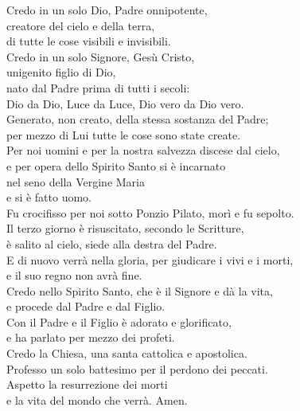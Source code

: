 
Credo in un solo Dio, Padre onnipotente,\\
creatore del cielo e della terra, \\
di tutte le cose visibili e invisibili.\\
Credo in un solo Signore, Gesù Cristo,\\
unigenito figlio di Dio,\\
nato dal Padre prima di tutti i secoli:\\
Dio da Dio, Luce da Luce, Dio vero da Dio vero.\\
Generato, non creato, della stessa sostanza del Padre;\\
per mezzo di Lui tutte le cose sono state create.\\
Per noi uomini e per la nostra salvezza discese dal cielo,\\ 
e per opera dello Spirito Santo si è incarnato\\
nel seno della Vergine Maria\\
e si è fatto uomo.\\	
Fu crocifisso per noi sotto Ponzio Pilato, morì e fu sepolto.\\
Il terzo giorno è risuscitato, secondo le Scritture,\\
è salito al cielo, siede alla destra del Padre.\\
E di nuovo verrà nella gloria, per giudicare i vivi e i morti,\\ 
e il suo regno non avrà fine.\\
Credo nello Spirito Santo, che è il Signore e dà la vita,\\
e procede dal Padre e dal Figlio.\\
Con il Padre e il Figlio è adorato e glorificato,\\
e ha parlato per mezzo dei profeti.\\
Credo la Chiesa, una santa cattolica e apostolica.\\
Professo un solo battesimo per il perdono dei peccati.\\
Aspetto la resurrezione dei morti\\
e la vita del mondo che verrà. Amen.